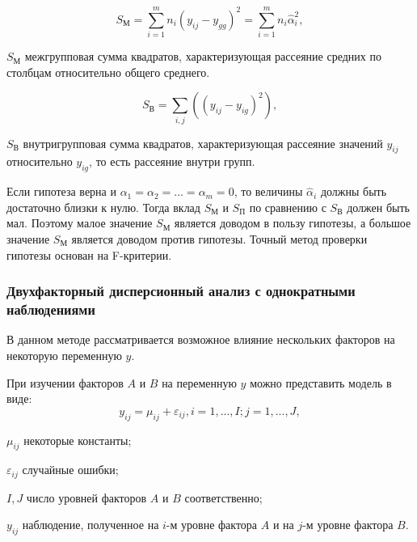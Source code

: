\begin{equation}
\label{eq:sp}
S_М=\sum_{i=1}^{m}{n_i\left(y_{ij}-y_{gg}\right)^2=\sum_{i=1}^{m}{n_i\widehat{\alpha}_i^2}},
\end{equation}
\begin{eqexpl}[15mm]
\item{$S_М$} межгрупповая сумма квадратов, характеризующая рассеяние средних по столбцам относительно общего среднего.
\end{eqexpl}

\begin{equation}
\label{eq:sv}
S_В=\sum_{i,j}{\left(\left(y_{ij}-y_{ig}\right)^2\right)},
\end{equation}
\begin{eqexpl}[15mm]
\item{$S_В$} внутригрупповая сумма квадратов, характеризующая рассеяние значений $y_{ij}$ относительно $y_{ig}$, то есть рассеяние внутри групп.
\end{eqexpl}

Если гипотеза верна и $\alpha_1=\alpha_2=...=\alpha_m=0$, то величины $\widehat{\alpha}_i$ должны быть достаточно близки к нулю. Тогда вклад $S_М$ и $S_П$ по сравнению с $S_В$ должен быть мал. Поэтому малое значение $S_М$ является доводом в пользу гипотезы, а большое значение $S_М$ является доводом против гипотезы. Точный метод проверки гипотезы основан на F-критерии. \cite{disperMethod}

\subsubsection{Двухфакторный дисперсионный анализ с однократными наблюдениями}

В данном методе рассматривается возможное влияние нескольких факторов на некоторую переменную $y$.

При изучении факторов $A$ и $B$ на переменную $y$ можно представить модель в виде:
\begin{equation}
\label{eq:modelTwoFactors}
y_{ij}=\mu_{ij}+\varepsilon_{ij},i=1,...,I;j=1,...,J,
\end{equation}
\begin{eqexpl}[15mm]
\item{$\mu_{ij}$} некоторые константы;
\item{$\varepsilon_{ij}$} случайные ошибки;
\item{$I,J$} число уровней факторов $A$ и $B$ соответственно;
\item{$y_{ij}$} наблюдение, полученное на $i$-м уровне фактора $A$ и на $j$-м уровне фактора $B$.
\end{eqexpl}

